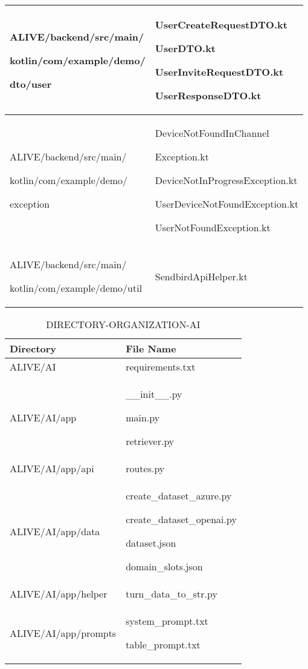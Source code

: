 \documentclass[conference]{IEEEtran}
\begin{document}
\begin{enumerate}
\begin{itemize}
\begin{itemize}
\begin{enumerate}
\begin{table}[h!]
\begin{tabular}{|p{3.9cm}|p{4.4cm}|}
          ALIVE/backend/src/main/ \par kotlin/com/example/demo/ \par dto/user & UserCreateRequestDTO.kt \par UserDTO.kt \par UserInviteRequestDTO.kt \par UserResponseDTO.kt \\ \hline

          ALIVE/backend/src/main/ \par kotlin/com/example/demo/ \par exception & DeviceNotFoundInChannel \par Exception.kt\par DeviceNotInProgressException.kt \par UserDeviceNotFoundException.kt \par UserNotFoundException.kt \\ \hline

          ALIVE/backend/src/main/ \par kotlin/com/example/demo/util & SendbirdApiHelper.kt \\ \hline
          
	\end{tabular}
\end{table}

\begin{table}[h]
\caption{DIRECTORY-ORGANIZATION-AI}
\def\arraystretch{1.24} \small
    \begin{tabular}{|p{3.9cm}|p{4cm}|}
\hline
        Directory & File Name \\ \hline
          ALIVE/AI \par  & requirements.txt \\ \hline
          ALIVE/AI/app \par  & \_\_init\_\_.py \par main.py \par retriever.py \\ \hline
          ALIVE/AI/app/api \par  & routes.py \\ \hline
          ALIVE/AI/app/data \par  & create\_dataset\_azure.py \par create\_dataset\_openai.py \par dataset.json \par domain\_slots.json  \\ \hline
          ALIVE/AI/app/helper \par  &  turn\_data\_to\_str.py \\ \hline
          ALIVE/AI/app/prompts \par  & system\_prompt.txt \par table\_prompt.txt \\ \hline
        

\end{tabular}
\end{table}
\end{enumerate}
\end{itemize}
\end{itemize}
\end{enumerate}
\end{document}
